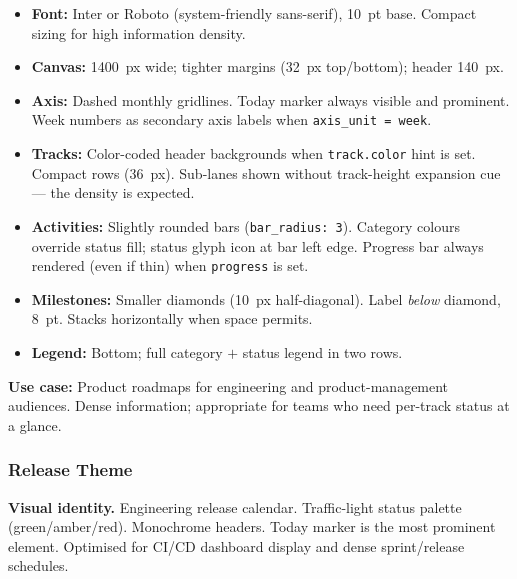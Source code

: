 \begin{itemize}
  \item \textbf{Font:} Inter or Roboto (system-friendly sans-serif), 10~pt base. Compact
        sizing for high information density.
  \item \textbf{Canvas:} 1400~px wide; tighter margins (32~px top/bottom); header 140~px.
  \item \textbf{Axis:} Dashed monthly gridlines. Today marker always visible and prominent.
        Week numbers as secondary axis labels when \texttt{axis\_unit = week}.
  \item \textbf{Tracks:} Color-coded header backgrounds when \texttt{track.color} hint is
        set. Compact rows (36~px). Sub-lanes shown without track-height expansion cue ---
        the density is expected.
  \item \textbf{Activities:} Slightly rounded bars (\texttt{bar\_radius: 3}). Category
        colours override status fill; status glyph icon at bar left edge. Progress bar
        always rendered (even if thin) when \texttt{progress} is set.
  \item \textbf{Milestones:} Smaller diamonds (10~px half-diagonal). Label \emph{below}
        diamond, 8~pt. Stacks horizontally when space permits.
  \item \textbf{Legend:} Bottom; full category $+$ status legend in two rows.
\end{itemize}

\textbf{Use case:} Product roadmaps for engineering and product-management audiences.
Dense information; appropriate for teams who need per-track status at a glance.

\subsubsection{Release Theme}
\label{sec:theme-release}

\textbf{Visual identity.}
Engineering release calendar. Traffic-light status palette (green/amber/red). Monochrome
headers. Today marker is the most prominent element. Optimised for CI/CD dashboard display
and dense sprint/release schedules.

